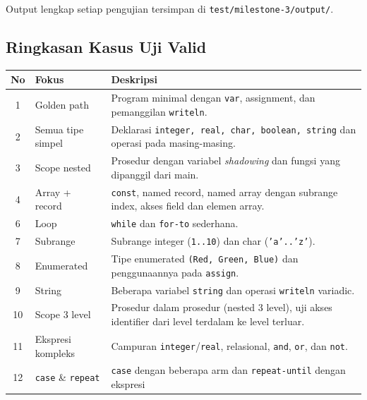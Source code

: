 \documentclass[11pt,a4paper]{article}
\begin{document}
Output lengkap setiap pengujian tersimpan di
\texttt{test/milestone-3/output/}.

\subsection{Ringkasan Kasus Uji Valid}

\begin{table}[H]
\centering
\footnotesize
\begin{tabularx}{\textwidth}{c l X}
\toprule
\textbf{No} & \textbf{Fokus} & \textbf{Deskripsi} \\
\midrule
1  & Golden path           & Program minimal dengan \texttt{var}, assignment,
                             dan pemanggilan \texttt{writeln}. \\
2  & Semua tipe simpel     & Deklarasi \texttt{integer, real, char, boolean,
                             string} dan operasi pada masing-masing. \\
3  & Scope nested          & Prosedur dengan variabel \textit{shadowing} dan
                             fungsi yang dipanggil dari main. \\
4  & Array + record        & \texttt{const}, named record, named array dengan
                             subrange index, akses field dan elemen array. \\
6  & Loop                  & \texttt{while} dan \texttt{for-to} sederhana. \\
7  & Subrange              & Subrange integer (\texttt{1..10}) dan char
                             (\texttt{'a'..'z'}). \\
8  & Enumerated            & Tipe enumerated \texttt{(Red, Green, Blue)} dan
                             penggunaannya pada \texttt{assign}. \\
9  & String                & Beberapa variabel \texttt{string} dan operasi
                             \texttt{writeln} variadic. \\
10 & Scope 3 level         & Prosedur dalam prosedur (nested 3 level), uji
                             akses identifier dari level terdalam ke level
                             terluar. \\
11 & Ekspresi kompleks     & Campuran \texttt{integer}/\texttt{real},
                             relasional, \texttt{and}, \texttt{or}, dan
                             \texttt{not}. \\
12 & \texttt{case} \&
     \texttt{repeat}       & \texttt{case} dengan beberapa arm dan
                             \texttt{repeat-until} dengan ekspresi

\end{tabularx}
\end{table}
\end{document}

